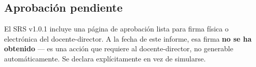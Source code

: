 \subsection{Aprobación pendiente}

El SRS v1.0.1 incluye una página de aprobación lista para firma física o electrónica del
docente-director. A la fecha de este informe, esa firma \textbf{no se ha obtenido} --- es una acción que
requiere al docente-director, no generable automáticamente. Se declara explícitamente en vez de
simularse.
\newpage
